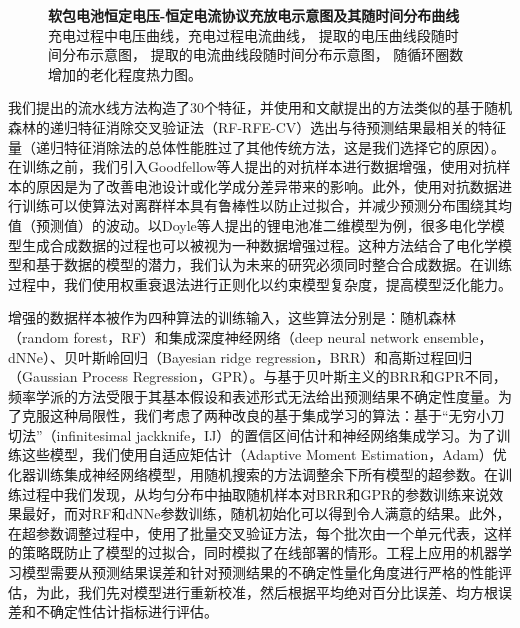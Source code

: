 \documentclass{article}
\begin{document}
\begin{figure*}[h!]
{\begin{tabular}[t]{ccc}
\end{tabular}
}

\caption{\textbf{软包电池恒定电压-恒定电流协议充放电示意图及其随时间分布曲线} \textbf{\protect{}} 充电过程中电压曲线，\textbf{\protect{}}充电过程电流曲线，\textbf{\protect{}} 提取的电压曲线段随时间分布示意图，\textbf{\protect{}} 提取的电流曲线段随时间分布示意图，\textbf{\protect{}} 随循环圈数增加的老化程度热力图。}
\label{features_calce}
\end{figure*}

我们提出的流水线方法构造了30个特征，并使用和文献\cite{Guyon2002}提出的方法类似的基于随机森林的递归特征消除交叉验证法（RF-RFE-CV）选出与待预测结果最相关的特征量（递归特征消除法的总体性能胜过了其他传统方法\cite{Darst2018, Gregorutti2017}，这是我们选择它的原因）。在训练之前，我们引入Goodfellow等人提出的对抗样本\cite{ref47}进行数据增强，使用对抗样本的原因是为了改善电池设计或化学成分差异带来的影响。此外，使用对抗数据进行训练可以使算法对离群样本具有鲁棒性以防止过拟合，并减少预测分布围绕其均值（预测值）的波动。以Doyle等人提出的锂电池准二维模型为例\cite{Doyle1993}，很多电化学模型生成合成数据的过程也可以被视为一种数据增强过程。这种方法结合了电化学模型和基于数据的模型的潜力，我们认为未来的研究必须同时整合合成数据。在训练过程中，我们使用权重衰退法进行正则化以约束模型复杂度，提高模型泛化能力。

增强的数据样本被作为四种算法的训练输入，这些算法分别是：随机森林（random forest，RF）和集成深度神经网络（deep neural network ensemble，dNNe）、贝叶斯岭回归（Bayesian ridge regression，BRR）和高斯过程回归（Gaussian Process Regression，GPR）。与基于贝叶斯主义的BRR和GPR不同，频率学派的方法受限于其基本假设和表述形式无法给出预测结果不确定性度量。为了克服这种局限性，我们考虑了两种改良的基于集成学习的算法：基于“无穷小刀切法”（infinitesimal jackknife，IJ）的置信区间估计\cite{Wager2014}和神经网络集成学习\cite{ref50}。为了训练这些模型，我们使用自适应矩估计（Adaptive Moment Estimation，Adam）优化器训练集成神经网络模型，用随机搜索的方法调整余下所有模型的超参数\cite{Bergstra2012}。在训练过程中我们发现，从均匀分布中抽取随机样本对BRR和GPR的参数训练来说效果最好，而对RF和dNNe参数训练，随机初始化可以得到令人满意的结果。此外，在超参数调整过程中，使用了批量交叉验证方法，每个批次由一个单元代表，这样的策略既防止了模型的过拟合，同时模拟了在线部署的情形。工程上应用的机器学习模型需要从预测结果误差和针对预测结果的不确定性量化角度进行严格的性能评估，为此，我们先对模型进行重新校准，然后根据平均绝对百分比误差、均方根误差和不确定性估计指标进行评估。
\end{document}
